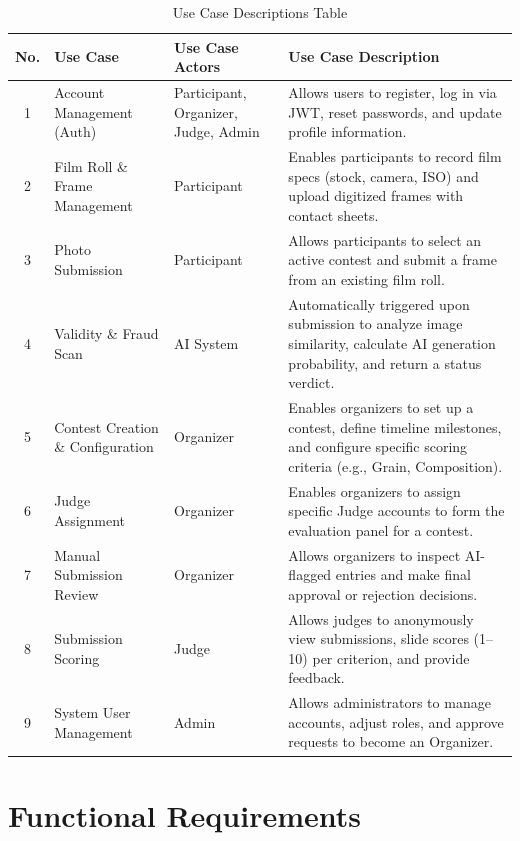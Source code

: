 \documentclass[12pt,a4paper]{article}
\begin{document}
\begin{longtable}{c p{3.2cm} p{3.2cm} p{5.5cm}}
\caption{Use Case Descriptions Table} \label{tab:usecase_desc} \\
\toprule
\textbf{No.} & \textbf{Use Case} & \textbf{Use Case Actors} & \textbf{Use Case Description} \\
\midrule
\endhead

\bottomrule
\endfoot

1 & Account Management (Auth) & Participant, Organizer, Judge, Admin & Allows users to register, log in via JWT, reset passwords, and update profile information. \\ \hline
2 & Film Roll \& Frame Management & Participant & Enables participants to record film specs (stock, camera, ISO) and upload digitized frames with contact sheets. \\ \hline
3 & Photo Submission & Participant & Allows participants to select an active contest and submit a frame from an existing film roll. \\ \hline
4 & Validity \& Fraud Scan & AI System & Automatically triggered upon submission to analyze image similarity, calculate AI generation probability, and return a status verdict. \\ \hline
5 & Contest Creation \& Configuration & Organizer & Enables organizers to set up a contest, define timeline milestones, and configure specific scoring criteria (e.g., Grain, Composition). \\ \hline
6 & Judge Assignment & Organizer & Enables organizers to assign specific Judge accounts to form the evaluation panel for a contest. \\ \hline
7 & Manual Submission Review & Organizer & Allows organizers to inspect AI-flagged entries and make final approval or rejection decisions. \\ \hline
8 & Submission Scoring & Judge & Allows judges to anonymously view submissions, slide scores (1--10) per criterion, and provide feedback. \\ \hline
9 & System User Management & Admin & Allows administrators to manage accounts, adjust roles, and approve requests to become an Organizer. \\
\end{longtable}

\newpage
\section{Functional Requirements}
\end{document}
